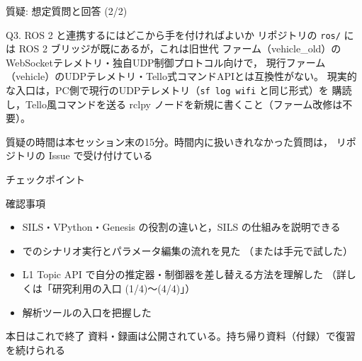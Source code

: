 \begin{frame}{質疑: 想定質問と回答 (2/2)}
  \footnotesize
  \begin{block}{Q3. ROS 2 と連携するにはどこから手を付ければよいか}
    リポジトリの \texttt{ros/} には ROS 2 ブリッジが既にあるが，これは旧世代
    ファーム（vehicle\_old）のWebSocketテレメトリ・独自UDP制御プロトコル向けで，
    現行ファーム（vehicle）のUDPテレメトリ・Tello式コマンドAPIとは互換性がない。
    現実的な入口は，PC側で現行のUDPテレメトリ（\texttt{sf log wifi} と同じ形式）を
    購読し，Tello風コマンドを送る rclpy ノードを新規に書くこと（ファーム改修は不要）。
  \end{block}

  \vspace{1.5em}

  {\small 質疑の時間は本セッション末の15分。時間内に扱いきれなかった質問は，
  リポジトリの Issue で受け付けている}
\end{frame}

\begin{frame}{チェックポイント}
  \begin{alertblock}{確認事項}\small
    \begin{itemize}\setlength{\itemsep}{1pt}
      \item[$\square$] SILS・VPython・Genesis の役割の違いと，SILS の仕組みを説明できる
      \item[$\square$]  でのシナリオ実行とパラメータ編集の流れを見た
            （または手元で試した）
      \item[$\square$] L1 Topic API で自分の推定器・制御器を差し替える方法を理解した
            （詳しくは「研究利用の入口 (1/4)〜(4/4)」）
      \item[$\square$] 解析ツールの入口を把握した
    \end{itemize}
  \end{alertblock}

  \vspace{0.2em}

  \begin{block}{本日はこれで終了}
    資料・録画は公開されている。持ち帰り資料（付録）で復習を続けられる
  \end{block}
\end{frame}
